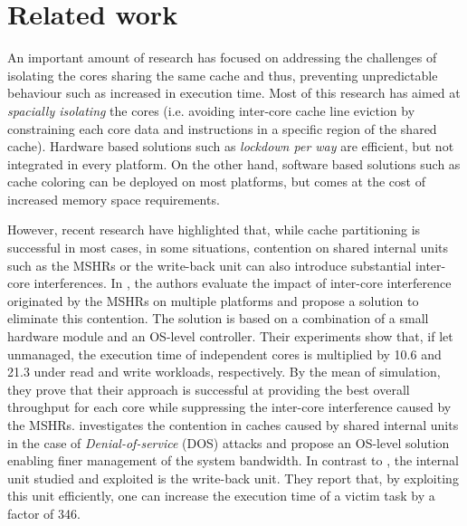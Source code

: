 \section{Related work}
    An important amount of research has focused on addressing the challenges of isolating the cores sharing the same cache and thus, preventing unpredictable behaviour such as increased in execution time.
    Most of this research \cite{Mancuso2013RealtimeCM, 6755286} has aimed at \emph{spacially isolating} the cores (i.e. avoiding inter-core cache line eviction by constraining each core data and instructions in a specific region of the shared cache).
    Hardware based solutions such as \emph{lockdown per way} \cite{Giovani_cahe_partitioning_survey} are efficient, but not integrated in every platform.
    On the other hand, software based solutions such as cache coloring \cite{Mancuso2013RealtimeCM} can be deployed on most platforms, but comes at the cost of increased memory space requirements.

    However, recent research \cite{Valsan2017AddressingIC, Heechul_DDOS_attacks_on_shared_cache} have highlighted that, while cache partitioning is successful in most cases, in some situations, contention on shared internal units such as the MSHRs or the write-back unit can also introduce substantial inter-core interferences.
    In \cite{Valsan2017AddressingIC}, the authors evaluate the impact of inter-core interference originated by the MSHRs on multiple platforms and propose a solution to eliminate this contention. The solution is based on a combination of a small hardware module and an OS-level controller.
    Their experiments show that, if let unmanaged, the execution time of independent cores is multiplied by 10.6 and 21.3 under read and write workloads, respectively.
    By the mean of simulation, they prove that their approach is successful at providing the best overall throughput for each core while suppressing the inter-core interference caused by the MSHRs.
    \cite{Heechul_DDOS_attacks_on_shared_cache} investigates the contention in caches caused by shared internal units in the case of \emph{Denial-of-service} (DOS) attacks and propose an OS-level solution enabling finer management of the system bandwidth.
    In contrast to \cite{Valsan2017AddressingIC}, the internal unit studied and exploited is the write-back unit.
    They report that, by exploiting this unit efficiently, one can increase the execution time of a victim task by a factor of 346.
